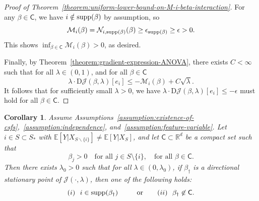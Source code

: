 \documentclass[sn-mathphys-num]{sn-jnl}%
\numberwithin{equation}{section}
\newcommand{\R}{\mathbb{R}}
\newcommand{\E}{\mathbb{E}}
\newtheorem{corollary}{Corollary}
\newcommand{\eps}{\epsilon}
\newcommand{\supp}{\mathop{\rm supp}}
\theoremstyle{thmstyleone}%
\newtheorem{theorem}{Theorem}%
\theoremstyle{thmstyletwo}%
\theoremstyle{thmstylethree}%
\begin{document}
\begin{proof}[Proof of Theorem~\ref{theorem:uniform-lower-bound-on-M-i-beta-interaction}]
For any $\beta \in \mathsf{C}$, we have $i \notin \supp(\beta)$ by assumption, so
\begin{equation*}
	\mathcal{M}_i(\beta) = \mathcal{N}_{i, \supp(\beta)}(\beta) \ge \eps_{\supp(\beta)} \ge \eps > 0.
\end{equation*}
This shows $\inf_{\beta \in \mathsf{C}} \mathcal{M}_i(\beta)  > 0$, as desired.
%
%
%

Finally, by Theorem~\ref{theorem:gradient-expression-ANOVA}, there exists $C < \infty$ such that for all $\lambda \in (0, 1)$,
and for all $\beta \in \mathsf{C}$
\begin{equation*}
	\lambda \cdot \mathrm{D}\mathcal{J}(\beta, \lambda)[e_i] \le -\mathcal{M}_i(\beta) + C \sqrt{\lambda}.
\end{equation*}
It follows that for sufficiently small \( \lambda > 0 \), we have
$\lambda \cdot \mathrm{D}\mathcal{J}(\beta, \lambda)[e_i] \le -\eps$ must hold for all $\beta \in \mathsf{C}$.
\end{proof} 





\vspace{.5em} 
\begin{corollary}
\label{corollary:extraction-of-interaction-effect}
Assume Assumptions~\ref{assumption:existence-of-csfs},~\ref{assumption:independence}, and~\ref{assumption:feature-variable}.  
Let $i \in S \subset S_*$ with $\E[Y|X_{S \backslash \{i\}}] \ne \E[Y|X_S]$, and let $\mathsf{C} \subset \mathbb{R}^d$ be a compact set such that
\[
\beta_j > 0 \quad \text{for all } j \in S \setminus \{i\}, \quad \text{for all } \beta \in \mathsf{C}.
\]
Then there exists $\lambda_0 > 0$ such that for all $\lambda \in (0, \lambda_0)$, if $\beta_\dagger$ is a directional stationary point of $\mathcal{J}(\cdot, \lambda)$, then one of the following holds:
\begin{equation*}
	(i)~~i \in \supp(\beta_{\dag})~~\qquad \text{or} \qquad (ii)~~\beta_{\dag} \not \in \mathsf{C}.
\end{equation*} 
\end{corollary} 
\end{document}
